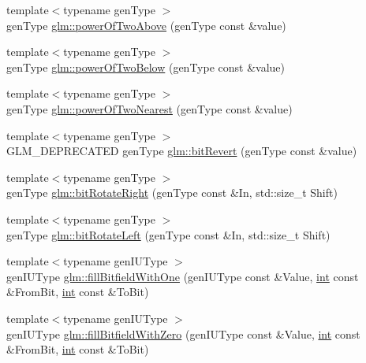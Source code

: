\begin{DoxyCompactItemize}
\item 
{\footnotesize template$<$typename gen\+Type $>$ }\\gen\+Type \hyperlink{group__gtx__bit_ga335322b4fcb2e5444ec467a1e7a40301}{glm\+::power\+Of\+Two\+Above} (gen\+Type const \&value)
\item 
{\footnotesize template$<$typename gen\+Type $>$ }\\gen\+Type \hyperlink{group__gtx__bit_ga4c3ea31127e64ec283fb6cf715b4d9ac}{glm\+::power\+Of\+Two\+Below} (gen\+Type const \&value)
\item 
{\footnotesize template$<$typename gen\+Type $>$ }\\gen\+Type \hyperlink{group__gtx__bit_ga00cb2e4b82215e4d531ec046c19e2ce7}{glm\+::power\+Of\+Two\+Nearest} (gen\+Type const \&value)
\item 
{\footnotesize template$<$typename gen\+Type $>$ }\\G\+L\+M\+\_\+\+D\+E\+P\+R\+E\+C\+A\+T\+E\+D gen\+Type \hyperlink{group__gtx__bit_ga655d3e378520be64a7832cdc8ebf20fb}{glm\+::bit\+Revert} (gen\+Type const \&value)
\item 
{\footnotesize template$<$typename gen\+Type $>$ }\\gen\+Type \hyperlink{group__gtx__bit_gae2ceed046e662a889cd938de3191dd55}{glm\+::bit\+Rotate\+Right} (gen\+Type const \&In, std\+::size\+\_\+t Shift)
\item 
{\footnotesize template$<$typename gen\+Type $>$ }\\gen\+Type \hyperlink{group__gtx__bit_gad9bc7e42a75381c3f6b68b8ba20863d3}{glm\+::bit\+Rotate\+Left} (gen\+Type const \&In, std\+::size\+\_\+t Shift)
\item 
{\footnotesize template$<$typename gen\+I\+U\+Type $>$ }\\gen\+I\+U\+Type \hyperlink{group__gtx__bit_gaf937428f9e6e9bb2e9214ff3be96cf95}{glm\+::fill\+Bitfield\+With\+One} (gen\+I\+U\+Type const \&Value, \hyperlink{_s_d_l__thread_8h_a6a64f9be4433e4de6e2f2f548cf3c08e}{int} const \&From\+Bit, \hyperlink{_s_d_l__thread_8h_a6a64f9be4433e4de6e2f2f548cf3c08e}{int} const \&To\+Bit)
\item 
{\footnotesize template$<$typename gen\+I\+U\+Type $>$ }\\gen\+I\+U\+Type \hyperlink{group__gtx__bit_gabb9c7b3bd390a61437667e5625834a7c}{glm\+::fill\+Bitfield\+With\+Zero} (gen\+I\+U\+Type const \&Value, \hyperlink{_s_d_l__thread_8h_a6a64f9be4433e4de6e2f2f548cf3c08e}{int} const \&From\+Bit, \hyperlink{_s_d_l__thread_8h_a6a64f9be4433e4de6e2f2f548cf3c08e}{int} const \&To\+Bit)
\end{DoxyCompactItemize}


